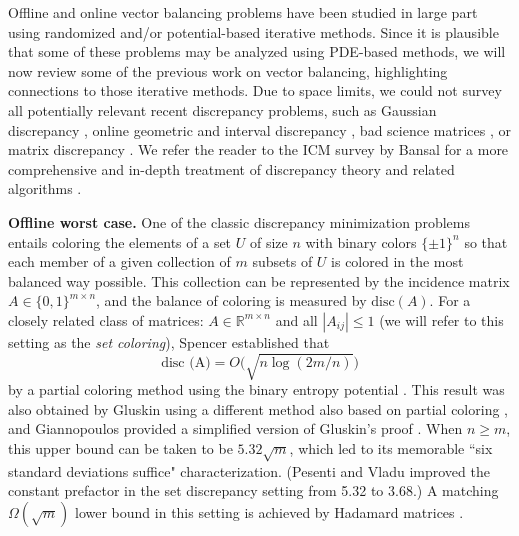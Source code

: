 \documentclass[reqno]{amsart}
\numberwithin{equation}{section}
\newcommand{\R}{\mathbb R}
\begin{document}
Offline and online vector balancing problems have been studied in large part using randomized and/or potential-based iterative methods.  Since it is plausible that some of these problems may be analyzed using  PDE-based methods,  we will now review some of the previous work on vector balancing, highlighting connections to those iterative methods.  Due to space limits, we could not survey all potentially relevant recent discrepancy problems, such as Gaussian discrepancy  \cite{CGRT22}, online geometric and interval discrepancy \cite {JKS19, BJSS20}, bad science matrices \cite{steinerberger2024badsciencematrices, albors2025structurebadsciencematrices, sinha2025structureextremalbadscience}, or matrix discrepancy \cite{BKMZ24, kunisky2025asymptoticboundsonlinealgorithms,bandeira2026matrixdiscrepancyrepresentationsfinite}.
 We refer the reader to the ICM survey by Bansal for a more comprehensive and in-depth treatment of  discrepancy theory and related algorithms \cite{Bansal22}. 
 
 


\textbf{Offline worst case.} One of the classic  discrepancy minimization problems entails coloring the  elements of a set $U$ of size $n$ with binary colors $\{\pm 1\}^n$  so that  each member of a given collection  of $m$ subsets of $U$ is colored in the most balanced way possible. This collection can be represented by the incidence matrix  $A \in \{0,1\}^{m\times n}$, and the balance of coloring is measured by $\text{disc}(A)$. For a closely related class of matrices: $A \in \R^{m \times n }$ and all $|A_{ij}|\leq 1$ (we will refer to this setting  as the \emph {set coloring}),  Spencer established that \[
\text{disc (A)} =O \big(\sqrt {n \log( 2m /n) }\big) 
\]by a partial coloring method using the binary entropy potential \cite {Spe85}. This result was also obtained by  Gluskin  using a different method also based on partial coloring \cite{Glushkin89}, and Giannopoulos provided a simplified version of Gluskin's proof  \cite{Giannopoulos1997}.  When $n \geq m$,  this  upper bound can be taken to be   $5.32 \sqrt {m}$,  which led to its memorable ``six standard deviations suffice" characterization. (Pesenti and Vladu \cite{PesentiVladu2023} improved the constant prefactor in the set discrepancy setting from 5.32 to 3.68.) A matching $\Omega (\sqrt{m})$ lower bound in this setting is achieved by Hadamard matrices \cite{Chazelle2000, AS2000}.
\end{document}
